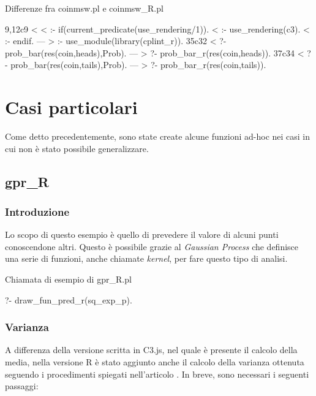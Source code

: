 \documentclass[10pt,titlepage,twoside,a4paper]{report}
\newenvironment{code}{\singlespacing\captionsetup{type=listing}}{}
\begin{document}
\begin{code}
\caption{Differenze fra coinmsw.pl e coinmsw\_R.pl}
\label{lst:diffcoinmsw}
\begin{prologcode*}{}
9,12c9
< 
< :- if(current_predicate(use_rendering/1)).
< :- use_rendering(c3).
< :- endif.
---
> :- use_module(library(cplint_r)).
35c32
< ?- prob_bar(res(coin,heads),Prob).  %
---
> ?- prob_bar_r(res(coin,heads)).  %
37c34
< ?- prob_bar(res(coin,tails),Prob).  %
---
> ?- prob_bar_r(res(coin,tails)).  %
\end{prologcode*}
\end{code}

\section{Casi particolari} \label{sec:casiParticolari}
Come detto precedentemente, sono state create alcune funzioni ad-hoc
nei casi in cui non è stato possibile generalizzare.

\subsection{gpr\_R}
\subsubsection{Introduzione}
Lo scopo di questo esempio è quello di prevedere il valore di alcuni punti 
conoscendone altri. Questo è possibile grazie al \emph{Gaussian Process} che 
definisce una serie di funzioni, anche chiamate \emph{kernel}, per fare questo 
tipo di analisi.

\begin{code}
\caption{Chiamata di esempio di gpr\_R.pl}
\label{lst:gprRExample}
\begin{prologcode*}{}
?- draw_fun_pred_r(sq_exp_p).
\end{prologcode*}
\end{code}

\subsubsection{Varianza}
A differenza della versione scritta in C3.js, nel quale è presente il 
calcolo della media, nella versione R è stato aggiunto 
anche il calcolo della varianza ottenuta seguendo i procedimenti spiegati 
nell'articolo  \cite{gpr}. In breve, sono necessari i seguenti 
passaggi:
\end{document}
